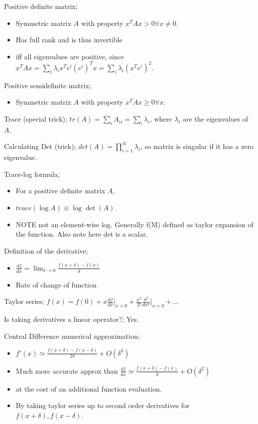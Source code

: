 \documentclass{article}
\begin{document}
Positive definite matrix; \begin{itemize} \item Symmetric matrix $A$ with property $x^TAx >  0 \forall x \ne 0$. \item Has full rank and is thus invertible \item iff all eigenvalues are positive, since $x^TAx = \sum_i \lambda_i x^Te^i(e^i)^Tx = \sum_i \lambda_i (x^Te^i)^2$. \end{itemize}

Positive semidefinite matrix; \begin{itemize} \item Symmetric matrix $A$ with property $x^TAx \geq  0 \forall x$. \end{itemize}

Trace (special trick); $tr(A) = \sum_i A_{ii} = \sum_i{\lambda_i}$, where $\lambda_i$ are the eigenvalues of $A$.

Calculating Det (trick); $det(A) = \prod_{i=1}^{N}\lambda_i$, so matrix is singular if it has a zero eigenvalue.

Trace-log formula; \begin{itemize} \item For a positive definite matrix $A$, \item $trace(\log A) \equiv \log \det (A)$. \item NOTE not an element-wise log. Generally f(M) defined as taylor expansion of the function. Also note here det is a scalar. \end{itemize}

Definition of the derivative; \begin{itemize} \item $\frac{df}{dx} = \lim_{\delta\rightarrow 0}\frac{f(x+\delta)-f(x)}{\delta}$ \item Rate of change of function \end{itemize}

Taylor series; $f(x) = f(0) + x\frac{df}{dx}\vert_{x=0} + \frac{x^2}{2!}\frac{d^f}{dx^2}\vert_{x=0}+...$

Is taking derivatives a linear operator?; Yes.

Central Difference numerical approximation; \begin{itemize} \item $f'(x)\simeq \frac{f(x+\delta) - f(x-\delta)}{2\delta} + O(\delta^3)$ \item Much more accurate approx than $\frac{df}{dx}\simeq \frac{f(x+\delta) - f(x)}{\delta} + O(\delta^2)$ \item at the cost of an additional function evaluation. \item By taking taylor series up to second order derivatives for $f(x+\delta), f(x-\delta)$. \end{itemize} 
\end{document}
